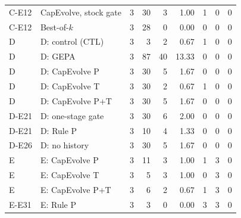 \begin{table}[t]
{\begin{tabular}{@{}llrrrrrrr@{}}
C-E12 & CapEvolve, stock gate & 3 & 30 & 3 & 1.00 & 1 & 0 & 0 \\
C-E12 & Best-of-$k$ & 3 & 28 & 0 & 0.00 & 0 & 0 & 0 \\
D & D: control (CTL) & 3 & 3 & 2 & 0.67 & 1 & 0 & 0 \\
D & D: GEPA & 3 & 87 & 40 & 13.33 & 0 & 0 & 0 \\
D & D: CapEvolve P & 3 & 30 & 5 & 1.67 & 0 & 0 & 0 \\
D & D: CapEvolve T & 3 & 30 & 2 & 0.67 & 1 & 0 & 0 \\
D & D: CapEvolve P+T & 3 & 30 & 5 & 1.67 & 0 & 0 & 0 \\
D-E21 & D: one-stage gate & 3 & 30 & 6 & 2.00 & 0 & 0 & 0 \\
D-E21 & D: Rule P & 3 & 10 & 4 & 1.33 & 0 & 0 & 0 \\
D-E26 & D: no history & 3 & 30 & 5 & 1.67 & 0 & 0 & 0 \\
E & E: CapEvolve P & 3 & 11 & 3 & 1.00 & 1 & 3 & 0 \\
E & E: CapEvolve T & 3 & 5 & 3 & 1.00 & 0 & 3 & 0 \\
E & E: CapEvolve P+T & 3 & 6 & 2 & 0.67 & 1 & 3 & 0 \\
E-E31 & E: Rule P & 3 & 3 & 0 & 0.00 & 3 & 3 & 0 \\
\bottomrule
\end{tabular}
}
\end{table}
